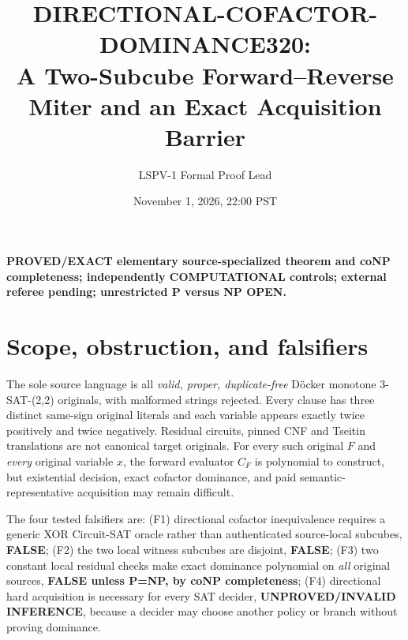 \documentclass[11pt]{article}
\title{DIRECTIONAL-COFACTOR-DOMINANCE320:\\ A Two-Subcube Forward--Reverse Miter and an Exact Acquisition Barrier}
\author{LSPV-1 Formal Proof Lead}
\date{November 1, 2026, 22:00 PST}
\begin{document}
\maketitle
\noindent\textbf{PROVED/EXACT elementary source-specialized theorem and coNP completeness; independently COMPUTATIONAL controls; external referee pending; unrestricted P versus NP OPEN.}

\section{Scope, obstruction, and falsifiers}
The sole source language is all \emph{valid, proper, duplicate-free} D\"ocker monotone 3-SAT-(2,2) originals, with malformed strings rejected. Every clause has three distinct same-sign original literals and each variable appears exactly twice positively and twice negatively. Residual circuits, pinned CNF and Tseitin translations are not canonical target originals. For every such original $F$ and \emph{every} original variable $x$, the forward evaluator $C_F$ is polynomial to construct, but existential decision, exact cofactor dominance, and paid semantic-representative acquisition may remain difficult.

The four tested falsifiers are: (F1) directional cofactor inequivalence requires a generic XOR Circuit-SAT oracle rather than authenticated source-local subcubes, \textbf{FALSE}; (F2) the two local witness subcubes are disjoint, \textbf{FALSE}; (F3) two constant local residual checks make exact dominance polynomial on \emph{all} original sources, \textbf{FALSE unless P=NP, by coNP completeness}; (F4) directional hard acquisition is necessary for every SAT decider, \textbf{UNPROVED/INVALID INFERENCE}, because a decider may choose another policy or branch without proving dominance.
\end{document}
